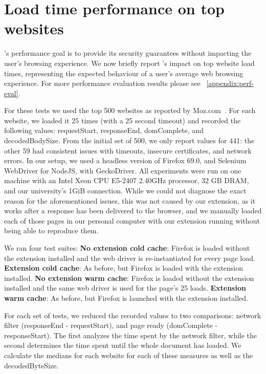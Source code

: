 \section{Load time performance on top websites} \label{performance}

\sys's performance goal is to provide its security guarantees without
impacting the user's browsing experience. We now briefly report \sys's
impact on top website load times, representing the expected behaviour
of a user's average web browsing experience. For more performance
evaluation results please see ~\autoref{appendix:perf-eval}.

% 
For these tests we used the top 500 websites as
reported by Moz.com~\cite{top500}. For each website, we loaded it 25
times (with a 25 second timeout) and recorded the following values:
requestStart, responseEnd, domComplete, and decodedBodySize. From the
initial set of 500, we only report values for 441: the other 59 had
consistent issues with timeouts, insecure certificates, and network
errors. In our setup, we used a headless version of Firefox 69.0, and
Selenium WebDriver for NodeJS, with GeckoDriver. All experiments were
run on one machine with an Intel Xeon CPU E5-2407 2.40GHz processor,
32 GB DRAM, and our university's 1GiB connection. While we could not 
diagnose the exact reason for the aforementioned issues, this was not 
caused by our extension, as it works after a response has been
delivered to the browser, and we manually loaded each of those pages
in our personal computer with our extension running without 
being able to reproduce them.

We ran four test suites:
\textbf{No extension cold cache}: Firefox is loaded without the extension installed and the web driver is re-instantiated for every page load.
\textbf{Extension cold cache}: As before, but Firefox is loaded with the extension installed.
\textbf{No extension warm cache}: Firefox is loaded without the extension installed and the same web driver is used for the page's 25 loads.
\textbf{Extension warm cache}: As before, but Firefox is launched with the extension installed.

For each set of tests, we reduced the recorded values to two comparisons: network filter (responseEnd - requestStart), and page ready (domComplete - responseStart). The first analyzes the time spent by the network filter, while the second determines the time spent until the whole document has loaded. We calculate the medians for each website for each of these measures as well as the decodedByteSize.

